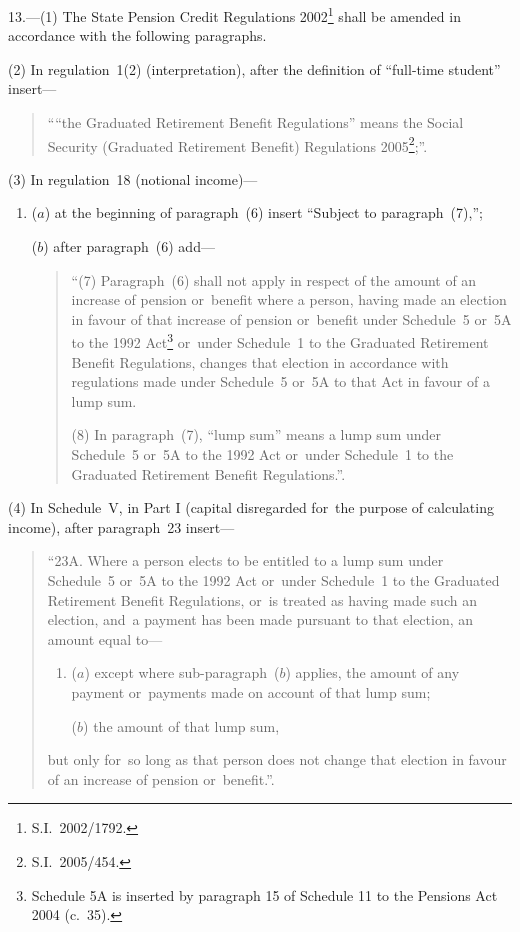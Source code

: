 \documentclass[12pt,a4paper]{article}
\begin{document}
13.---(1)  The State Pension Credit Regulations 2002\footnote{S.I.~2002/1792.} shall be amended in accordance with the following paragraphs.

(2) In regulation~1(2) (interpretation), after the definition of “full-time student” insert—
\begin{quotation}\sloppy
““the Graduated Retirement Benefit Regulations” means the Social Security (Graduated Retirement Benefit) Regulations 2005\footnote{S.I.~2005/454.};”.
\end{quotation}

(3) In regulation~18 (notional income)—
\begin{enumerate}\item[]
($a$) at the beginning of paragraph~(6) insert “Subject to paragraph~(7),”;

($b$) after paragraph~(6) add—
\begin{quotation}
“(7) Paragraph~(6) shall not apply in respect of the amount of an increase of pension or~benefit where a person, having made an election in favour of that increase of pension or~benefit under Schedule~5 or~5A to the 1992 Act\footnote{Schedule 5A is inserted by paragraph 15 of Schedule 11 to the Pensions Act 2004 (c.~35).} or~under Schedule~1 to the Graduated Retirement Benefit Regulations, changes that election in accordance with regulations made under Schedule~5 or~5A to that Act in favour of a lump sum.

(8) In paragraph~(7), “lump sum” means a lump sum under Schedule~5 or~5A to the 1992 Act or~under Schedule~1 to the Graduated Retirement Benefit Regulations.”.
\end{quotation}
\end{enumerate}

(4) In Schedule~V, in Part I (capital disregarded for~the purpose of calculating income), after paragraph~23 insert—
\begin{quotation}
“23A.  Where a person elects to be entitled to a lump sum under Schedule~5 or~5A to the 1992 Act or~under Schedule~1 to the Graduated Retirement Benefit Regulations, or~is treated as having made such an election, and~a payment has been made pursuant to that election, an amount equal to—
\begin{enumerate}\item[]
($a$) except where sub-paragraph~($b$)  applies, the amount of any payment or~payments made on account of that lump sum;

($b$) the amount of that lump sum,
\end{enumerate}
but only for~so long as that person does not change that election in favour of an increase of pension or~benefit.”.
\end{quotation}
\end{document}
